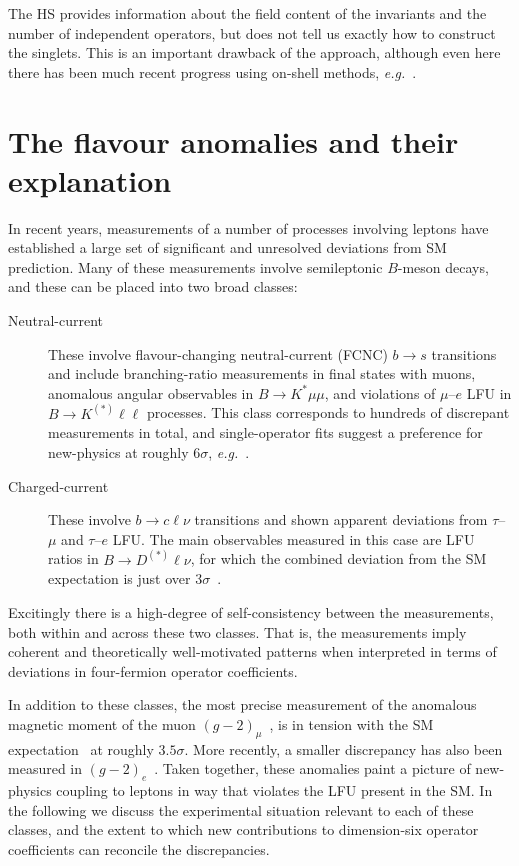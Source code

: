 The HS provides information about the field content of the invariants and the
number of independent operators, but does not tell us exactly how to construct
the singlets. This is an important drawback of the approach, although even here
there has been much recent progress using on-shell methods,
\textit{e.g.}~\cite{Ma:2019gtx, Henning:2019enq, Li:2020gnx, Li:2020xlh}.



\section{The flavour anomalies and their explanation}

In recent years, measurements of a number of processes involving leptons have
established a large set of significant and unresolved deviations from SM
prediction. Many of these measurements involve semileptonic $B$-meson decays,
and these can be placed into two broad classes:
\begin{description}
  \item[Neutral-current] These involve flavour-changing neutral-current (FCNC) $b \to s$ transitions and include branching-ratio measurements in final states with muons, anomalous angular observables in $B \to K^{*} \mu\mu$, and violations of $\mu$--$e$ LFU in $B \to K^{(*)} \ell \ell$ processes. This class corresponds to hundreds of discrepant measurements in total, and single-operator fits suggest a preference for new-physics at roughly $6\sigma$, \textit{e.g.}~\cite{Aebischer:2019mlg}.
  \item[Charged-current] These involve $b \to c \ell \nu$ transitions and shown apparent deviations from $\tau$--$\mu$ and $\tau$--$e$ LFU. The main observables measured in this case are LFU ratios in $B \to D^{(*)} \ell \nu$, for which the combined deviation from the SM expectation is just over $3\sigma$~\cite{Amhis:2019ckw}.
\end{description}
Excitingly there is a high-degree of self-consistency between the measurements,
both within and across these two classes. That is, the measurements imply
coherent and theoretically well-motivated patterns when interpreted in terms of
deviations in four-fermion operator coefficients.

In addition to these classes, the most precise measurement of the anomalous
magnetic moment of the muon $(g-2)_{\mu}$~\cite{Bennett:2006fi}, is in tension
with the SM expectation~\cite{Blum:2013xva} at roughly $3.5\sigma$. More
recently, a smaller discrepancy has also been measured in
$(g-2)_{e}$~\cite{Parker_2018}. Taken together, these anomalies paint a picture
of new-physics coupling to leptons in way that violates the LFU present in the
SM. In the following we discuss the experimental situation relevant to each of
these classes, and the extent to which new contributions to dimension-six
operator coefficients can reconcile the discrepancies.

